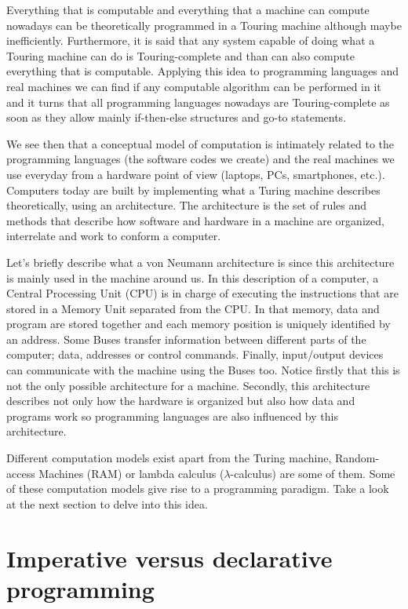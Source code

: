 Everything that is computable and everything that a machine can compute nowadays can be theoretically programmed in a Touring machine 
although maybe inefficiently. Furthermore, it is said that any system capable of doing what a Touring machine can do is Touring-complete and 
than can also compute everything that is computable. Applying this idea to programming languages and real machines we can find if any 
computable algorithm can be performed in it and it turns that all programming languages nowadays are Touring-complete as soon as they allow 
mainly if-then-else structures and go-to statements. 

We see then that a conceptual model of computation is intimately related to the programming languages (the software codes we create) and the 
real machines we use everyday from a hardware point of view (laptops, PCs, smartphones, etc.). Computers today are built by implementing what 
a Turing machine describes theoretically, using an architecture. The architecture is the set of rules and methods that describe how software 
and hardware in a machine are organized, interrelate and work to conform a computer.

Let's briefly describe what a von Neumann architecture is since this architecture is mainly used in the machine around us. 
In this description of a computer, a Central Processing Unit (CPU) is in charge of executing the instructions that are stored in a Memory Unit separated from the CPU. 
In that memory, data and program are stored together and each memory position is uniquely identified by an address. 
Some Buses transfer information between different parts of the computer; data, addresses or control commands. 
Finally, input/output devices can communicate with the machine using the Buses too. 
Notice firstly that this is not the only possible architecture for a machine. 
Secondly, this architecture describes not only how the hardware is organized but also how data and programs work so programming languages are also influenced by this architecture. 


Different computation models exist apart from the Turing machine, Random-access Machines (RAM) or lambda calculus ($\lambda$-calculus) are some of them. 
Some of these computation models give rise to a programming paradigm. Take a look at the next section to delve into this idea.  


 
 
\section{Imperative versus declarative programming} 

